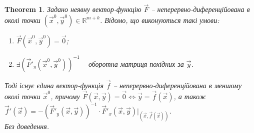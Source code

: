 \documentclass[a4paper, 10pt]{article}
\theoremstyle{theoremdd}
\newtheorem{theorem}{Theorem}[subsection]
\theoremstyle{theoremdd}
\theoremstyle{theoremdd}
\theoremstyle{theoremdd}
\theoremstyle{theoremdd}
\theoremstyle{theoremdd}
\theoremstyle{theoremdd}
\theoremstyle{theoremdd}
\theoremstyle{theoremdd}
\begin{document}
\begin{theorem}
Задано неявну вектор-функцію $\vec{F}$ -- неперервно-диференційована в околі точки $(\vec{x}^0, \vec{y}^0) \in \mathbb{R}^{m+k}$. Відомо, що виконуються такі умови:
\begin{enumerate}[nosep,wide=0pt,label={\arabic*)}]
\item $\vec{F}(\vec{x}^0,\vec{y}^0) = \vec{0}$;
\item $\exists \left(\vec{F}'_y(\vec{x}^0,\vec{y}^0)\right)^{-1}$ -- оборотна матриця похідних за $\vec{y}$.
\end{enumerate}
Тоді існує єдина вектор-функція $\vec{f}$ -- неперервно-диференційована в меншому околі точки $\vec{x}^0$, причому $\vec{F}(\vec{x},\vec{y}) = \vec{0} \iff \vec{y} = \vec{f}(\vec{x})$, а також $\vec{f}'(\vec{x}) = -(\vec{F}'_y(\vec{x},\vec{y}))^{-1} \cdot \vec{F}'_x (\vec{x},\vec{y}) \Big|_{(\vec{x}, \vec{f}(\vec{x}))}$.\\
\textit{Без доведення.}
\end{theorem}
\end{document}
